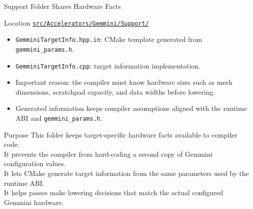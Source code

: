 \documentclass[aspectratio=169,10pt]{beamer}
\newcommand{\code}[1]{\texttt{\footnotesize #1}}
\newcommand{\repoRoot}{/home/lahcen/toolchains/onnx-mlir-xcompile/onnx-mlir}
\newcommand{\pathcode}[1]{\href{run:\repoRoot/#1}{\texttt{\scriptsize #1}}}
\begin{document}
\begin{frame}{Support Folder Shares Hardware Facts}
  \begin{block}{Location}
    \pathcode{src/Accelerators/Gemmini/Support/}
  \end{block}
  \begin{itemize}
    \item \code{GemminiTargetInfo.hpp.in}: CMake template generated from \code{gemmini\_params.h}.
    \item \code{GemminiTargetInfo.cpp}: target information implementation.
    \item Important reason: the compiler must know hardware sizes such as mesh dimensions, scratchpad capacity, and data widths before lowering.
    \item Generated information keeps compiler assumptions aligned with the runtime ABI and \code{gemmini\_params.h}.
  \end{itemize}
  \begin{block}{Purpose}
    This folder keeps target-specific hardware facts available to compiler code.\\
    It prevents the compiler from hard-coding a second copy of Gemmini configuration values.\\
    It lets CMake generate target information from the same parameters used by the runtime ABI.\\
    It helps passes make lowering decisions that match the actual configured Gemmini hardware.
  \end{block}
\end{frame}
\end{document}
